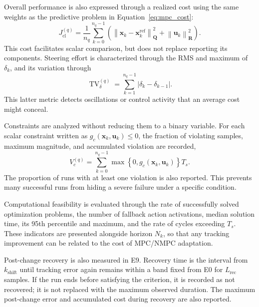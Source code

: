 \documentclass[12pt,a4paper]{report}
\begin{document}
Overall performance is also expressed through a realized cost using the same weights as the predictive problem in Equation~\eqref{eq:mpc_cost}:
\begin{equation}
    J^{(q)}_{\mathrm{cl}}
    =
    \frac{1}{n_q}
    \sum_{k=0}^{n_q-1}
    \left(
        \left\|\mathbf x_k-\mathbf x^{\mathrm{ref}}_k\right\|_{\mathbf Q}^{2}
        +
        \left\|\mathbf u_k\right\|_{\mathbf R}^{2}
    \right).
    \label{eq:realized_closed_loop_cost}
\end{equation}
This cost facilitates scalar comparison, but does not replace reporting its components. Steering effort is characterized through the RMS and maximum of $\delta_k$, and its variation through
\begin{equation}
    \operatorname{TV}^{(q)}_{\delta}
    =
    \sum_{k=1}^{n_q-1}
    |\delta_k-\delta_{k-1}|.
    \label{eq:steering_total_variation}
\end{equation}
This latter metric detects oscillations or control activity that an average cost might conceal.

Constraints are analyzed without reducing them to a binary variable. For each scalar constraint written as $g_c(\mathbf x_k,\mathbf u_k)\leq0$, the fraction of violating samples, maximum magnitude, and accumulated violation are recorded,
\begin{equation}
    V^{(q)}_c
    =
    \sum_{k=0}^{n_q-1}
    \max\!\left\{0,g_c(\mathbf x_k,\mathbf u_k)\right\}T_s.
    \label{eq:accumulated_constraint_violation}
\end{equation}
The proportion of runs with at least one violation is also reported. This prevents many successful runs from hiding a severe failure under a specific condition.

Computational feasibility is evaluated through the rate of successfully solved optimization problems, the number of fallback action activations, median solution time, its 95th percentile and maximum, and the rate of cycles exceeding $T_s$. These indicators are presented alongside horizon $N_k$, so that any tracking improvement can be related to the cost of MPC/NMPC adaptation.

Post-change recovery is also measured in E9. Recovery time is the interval from $k_{\mathrm{shift}}$ until tracking error again remains within a band fixed from E0 for $L_{\mathrm{rec}}$ samples. If the run ends before satisfying the criterion, it is recorded as not recovered; it is not replaced with the maximum observed duration. The maximum post-change error and accumulated cost during recovery are also reported.
\end{document}
